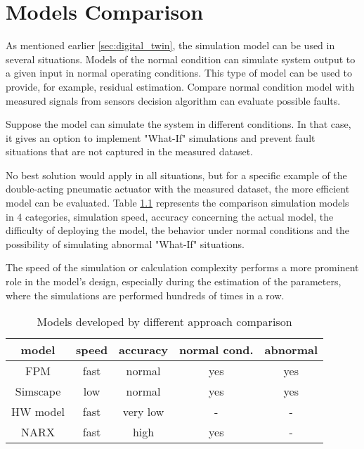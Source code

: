\chapter{Models Comparison}

As mentioned earlier \ref{sec:digital_twin}, the simulation model can be used in several
situations.  Models of the normal condition can simulate system output to a
given input in normal operating conditions. This type of model can be used
to provide, for example, residual estimation. Compare normal condition
model with measured signals from sensors decision algorithm can evaluate
possible faults. 

Suppose the model can simulate the system in different conditions. In that
case, it gives an option to implement  "What-If" simulations and prevent
fault situations that are not captured in the measured dataset.

No best solution would apply in all situations, but for a specific example
of the double-acting pneumatic actuator with the measured dataset, the more
efficient model can be evaluated. Table \ref{tab:models_compare} represents the comparison
simulation models in 4 categories, simulation speed, accuracy concerning
the actual model, the difficulty of deploying the model, the behavior under
normal conditions and the possibility of simulating abnormal "What-If"
situations.

The speed of the simulation or calculation complexity performs a more
prominent role in the model's design, especially during the estimation of
the parameters, where the simulations are performed hundreds of times in a
row.

\begin{table}[h]
    \centering
    \begin{tabular}{|c|c|c|c|c|}
\hline
\textbf{model} &\textbf{speed} &\textbf{accuracy} &\textbf{normal cond.} &\textbf{abnormal} \\
\hline
FPM            & fast          & normal           & yes                  & yes \\
Simscape       & low           & normal           & yes                  & yes \\
HW model       & fast          & very low         & -                    & - \\
NARX           & fast          & high             & yes                  & - \\
\hline
    \end{tabular}
    \caption{Models developed by different approach comparison}
    \label{tab:models_compare}
\end{table}
    
